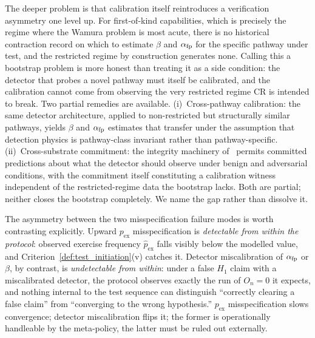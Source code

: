 The deeper problem is that calibration itself reintroduces a
verification asymmetry one level up.  For first-of-kind
capabilities, which is precisely the regime where the Wamura
problem is most acute, there is no historical contraction
record on which to estimate $\beta$ and $\alpha_{\mathrm{fp}}$ for the
specific pathway under test, and the restricted regime by
construction generates none.  Calling this a bootstrap problem
is more honest than treating it as a side condition: the
detector that probes a novel pathway must itself be calibrated,
and the calibration cannot come from observing the very
restricted regime CR is intended to break.  Two partial remedies
are available.  (i)~Cross-pathway calibration: the same detector
architecture, applied to non-restricted but structurally similar
pathways, yields $\beta$ and $\alpha_{\mathrm{fp}}$ estimates that transfer
under the assumption that detection physics is pathway-class
invariant rather than pathway-specific.  (ii)~Cross-substrate
commitment: the integrity machinery of~\citep{lasser2026exo}
permits committed predictions about what the detector should
observe under benign and adversarial conditions, with the
commitment itself constituting a calibration witness independent
of the restricted-regime data the bootstrap lacks.  Both are
partial; neither closes the bootstrap completely.  We name the
gap rather than dissolve it.

The asymmetry between the two misspecification failure modes is
worth contrasting explicitly.  Upward $p_{\mathrm{ex}}$
misspecification is \emph{detectable from within the protocol}:
observed exercise frequency $\hat{p}_{\mathrm{ex}}$ falls
visibly below the modelled value, and
Criterion~\ref{def:test_initiation}(v) catches it.  Detector
miscalibration of $\alpha_{\mathrm{fp}}$ or $\beta$, by contrast, is
\emph{undetectable from within}: under a false $H_1$ claim with
a miscalibrated detector, the protocol observes exactly the run
of $O_n = 0$ it expects, and nothing internal to the test
sequence can distinguish ``correctly clearing a false claim''
from ``converging to the wrong hypothesis.''
$p_{\mathrm{ex}}$ misspecification slows convergence; detector
miscalibration flips it; the former is operationally handleable
by the meta-policy, the latter must be ruled out externally.

